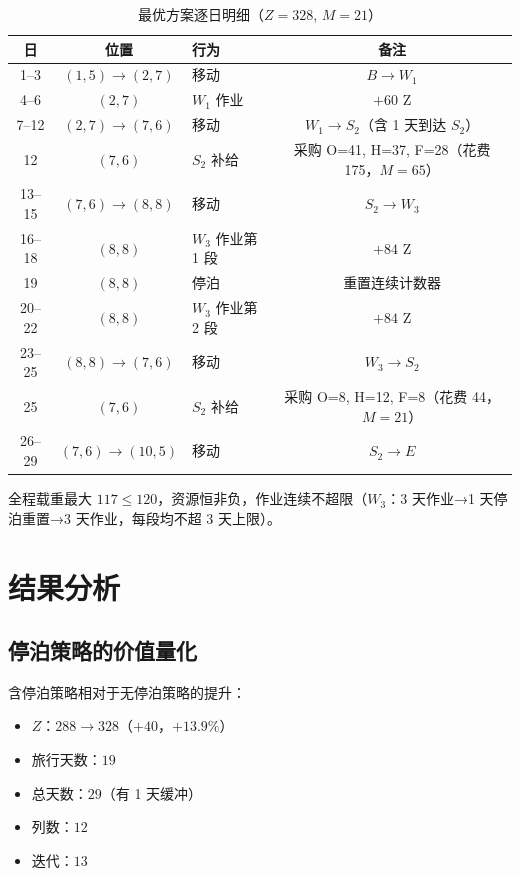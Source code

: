 \documentclass[12pt,a4paper]{ctexart}
\theoremstyle{definition}
\begin{document}
\begin{table}[H]
  \centering
  \caption{最优方案逐日明细（$Z=328$, $M=21$）}
  \begin{tabular}{cclc}
    \toprule
    日 & 位置 & 行为 & 备注 \\
    \midrule
    1--3   & $(1,5)\to(2,7)$  & 移动          & $B\to W_1$ \\
    4--6   & $(2,7)$          & $W_1$ 作业    & $+60$ Z \\
    7--12  & $(2,7)\to(7,6)$  & 移动          & $W_1\to S_2$（含 1 天到达 $S_2$）\\
    12     & $(7,6)$          & $S_2$ 补给    & 采购 O=41, H=37, F=28（花费 175，$M=65$）\\
    13--15 & $(7,6)\to(8,8)$  & 移动          & $S_2\to W_3$ \\
    16--18 & $(8,8)$          & $W_3$ 作业第 1 段 & $+84$ Z \\
    19     & $(8,8)$          & 停泊          & 重置连续计数器 \\
    20--22 & $(8,8)$          & $W_3$ 作业第 2 段 & $+84$ Z \\
    23--25 & $(8,8)\to(7,6)$  & 移动          & $W_3\to S_2$ \\
    25     & $(7,6)$          & $S_2$ 补给    & 采购 O=8, H=12, F=8（花费 44，$M=21$）\\
    26--29 & $(7,6)\to(10,5)$ & 移动          & $S_2\to E$ \\
    \bottomrule
  \end{tabular}
\end{table}

全程载重最大 $117\le 120$，资源恒非负，作业连续不超限（$W_3$：$3$ 天作业→1 天停泊重置→$3$ 天作业，每段均不超 $3$ 天上限）。

\section{结果分析}

\subsection{停泊策略的价值量化}

含停泊策略相对于无停泊策略的提升：
\begin{itemize}
  \item $Z$：$288\to 328$（$+40$，$+13.9\%$）
  \item 旅行天数：$19$
  \item 总天数：$29$（有 1 天缓冲）
  \item 列数：$12$
  \item 迭代：$13$
\end{itemize}
\end{document}
